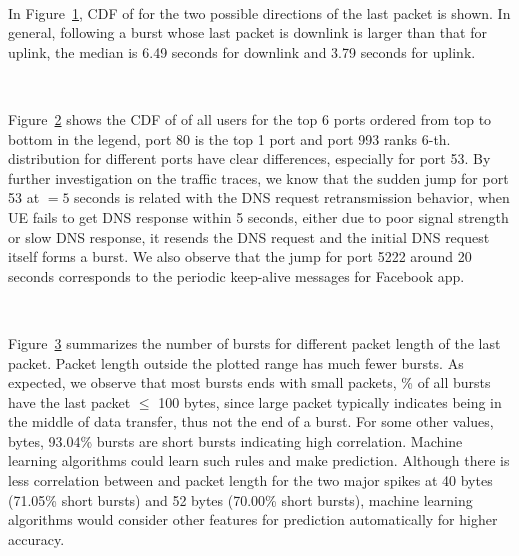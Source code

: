 \begin{figure}[t]
\centering
{} \\
\label{fig:dir1}
\end{figure}

In Figure~\ref{fig:dir1}, CDF of \IBT for the two possible directions of the last packet is shown. In general, \IBT following a burst whose last packet is downlink is larger than that for uplink, \eg the median \IBT is 6.49 seconds for downlink and 3.79 seconds for uplink.

\begin{figure}[t]
\centering
{} \\
\label{fig:port1}
\end{figure}
Figure~\ref{fig:port1} shows the CDF of \IBTS of all users for the top 6 ports ordered from top to bottom in the legend, \ie port 80 is the top 1 port and port 993 ranks 6-th. \IBT distribution for different ports have clear differences, especially for port 53. By further investigation on the traffic traces, we know that the sudden jump for port 53 at \IBT $=5$ seconds is related with the DNS request retransmission behavior, \ie when UE fails to get DNS response within 5 seconds, either due to poor signal strength or slow DNS response, it resends the DNS request and the initial DNS request itself forms a burst. We also observe that the jump for port 5222 around 20 seconds corresponds to the periodic keep-alive messages for Facebook app.

\begin{figure}[t]
\centering
{} \\
\label{fig:len1}
\end{figure}

Figure~\ref{fig:len1} summarizes the number of bursts for different packet length of the last packet. Packet length outside the plotted range has much fewer bursts. As expected, we observe that most bursts ends with small packets, \% of all bursts have the last packet $\leq$ 100 bytes, since large packet typically indicates being in the middle of data transfer, thus not the end of a burst. For some other values,  bytes, 93.04\% bursts are short bursts indicating high correlation. Machine learning algorithms could learn such rules and make prediction. Although there is less correlation between \IBT and packet length for the two major spikes at 40 bytes (71.05\% short bursts) and 52 bytes (70.00\% short bursts), machine learning algorithms would consider other features for prediction automatically for higher accuracy.

